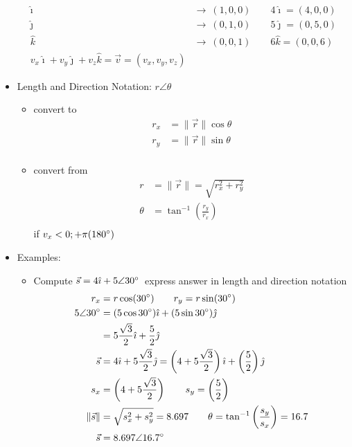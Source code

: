\documentclass{article}
\begin{document}
\begin{itemize}
\begin{align*}
    \hat{\imath}\ &\rightarrow\ (1,0,0)\qquad 4\hat{\imath}=(4,0,0)\\
    \hat{\jmath}\ &\rightarrow\ (0,1,0)\qquad 5\hat{\jmath}=(0,5,0)\\
    \hat{k}\ &\rightarrow\ (0,0,1)\qquad 6\hat{k}=(0,0,6)\\
    v_{x}\hat{\imath} + v_{y}\hat{\jmath} + v_{z}\hat{k} = \vec{v} = (v_{x},v_{y},v_{z})
  \end{align*}
  \item Length and Direction Notation: $r\angle\theta$
  \begin{itemize}
    \item convert to
    \begin{align*}
      r_{x} &= \|\vec{r}\|\cos\theta\\
      r_{y} &= \|\vec{r}\|\sin\theta\\
    \end{align*}
    \item convert from
    \begin{align*}
      r &= \|\vec{r}\| = \sqrt{r^{2}_{x} + r^{2}_{y}}\\
      \theta &= \tan^{-1}\left(\frac{r_{y}}{r_{x}}\right)\\
    \end{align*}
    if $v_{x} < 0; + \pi(180\degree)$
  \end{itemize}
  \item Examples:
  \begin{itemize}
    \item Compute $\vec{s} = 4\hat{\imath} + 5\angle30\degree$\ express answer in length and direction notation
    \begin{align*}
      r_{x} &= r\cos(30\degree)\qquad r_{y} = r\sin(30\degree)\\
      5\angle30\degree &= (5\cos30\degree)\hat{\imath} + (5\sin30\degree)\hat{\jmath}\\
      &= 5\frac{\sqrt{3}}{2}\hat{\imath} + \frac{5}{2}\hat{\jmath}\\
      \vec{s} &= 4\hat{\imath} + 5\frac{\sqrt{3}}{2}\hat{\jmath} = \left(4 + 5\frac{\sqrt{3}}{2}\right)\hat{\imath} + \left(\frac{5}{2}\right)\hat{\jmath}\\
      s_{x} &= \left(4 + 5\frac{\sqrt{3}}{2}\right)\qquad s_{y} = \left(\frac{5}{2}\right)\\
      \|\vec{s}\| &= \sqrt{s^{2}_{x} + s^{2}_{y}} = 8.697\qquad \theta = \tan^{-1}\left(\frac{s_{y}}{s_{x}}\right) = 16.7\\
      \vec{s} &= 8.697\angle16.7\degree

\end{align*}
\end{itemize}
\end{itemize}
\end{document}
